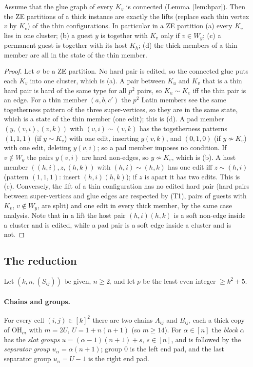 \begin{lemma}[Blow-up]\label{lem:hblow}
Assume that the glue graph of every $K_v$ is connected (Lemma~\ref{lem:hpar}). Then the ZE partitions of a thick instance are exactly the lifts (replace each thin vertex $v$ by $K_v$) of the thin configurations. In particular in a ZE partition (a) every $K_v$ lies in one cluster; (b) a guest $y$ is together with $K_v$ only if $v\in W_y$; (c) a permanent guest is together with its host $K_h$; (d) the thick members of a thin member are all in the state of the thin member.
\end{lemma}
\begin{proof}
Let $\sigma$ be a ZE partition. No hard pair is edited, so the connected glue puts each $K_v$ into one cluster, which is (a). A pair between $K_u$ and $K_v$ that is a thin hard pair is hard of the same type for all $p^2$ pairs, so $K_u\sim K_v$ iff the thin pair is an edge. For a thin member $(a,b,c')$ the $p^2$ Latin members see the same togetherness pattern of the three super-vertices, so they are in the same state, which is a state of the thin member (one edit); this is (d). A pad member $(y,(v,i),(v,k))$ with $(v,i)\sim(v,k)$ has the togetherness patterns $(1,1,1)$ (if $y\sim K_v$) with one edit, inserting $y(v,k)$, and $(0,1,0)$ (if $y\not\sim K_v$) with one edit, deleting $y(v,i)$; so a pad member imposes no condition. If $v\notin W_y$ the pairs $y(v,i)$ are hard non-edges, so $y\not\sim K_v$, which is (b). A host member $((h,i),z,(h,k))$ with $(h,i)\sim(h,k)$ has one edit iff $z\sim(h,i)$ (pattern $(1,1,1)$: insert $(h,i)(h,k)$); if $z$ is apart it has two edits. This is (c). Conversely, the lift of a thin configuration has no edited hard pair (hard pairs between super-vertices and glue edges are respected by (T1), pairs of guests with $K_v$, $v\notin W_y$, are split) and one edit in every thick member, by the same case analysis. Note that in a lift the host pair $(h,i)(h,k)$ is a soft non-edge inside a cluster and is edited, while a pad pair is a soft edge inside a cluster and is not.
\end{proof}

\subsection{The reduction}\label{sec:hred}
Let $(k,n,(S_{ij}))$ be given, $n\ge2$, and let $p$ be the least even integer $\ge k^2+5$.

\paragraph{Chains and groups.} For every cell $(i,j)\in[k]^2$ there are two chains $A_{ij}$ and $B_{ij}$, each a thick copy of $\mathrm{OH}_m$ with $m=2U$, $U=1+n(n+1)$ (so $m\ge14$). For $\alpha\in[n]$ the \emph{block} $\alpha$ has the \emph{slot groups} $u=(\alpha-1)(n+1)+s$, $s\in[n]$, and is followed by the \emph{separator group} $u_\alpha=\alpha(n+1)$; group $0$ is the left end pad, and the last separator group $u_n=U-1$ is the right end pad.

